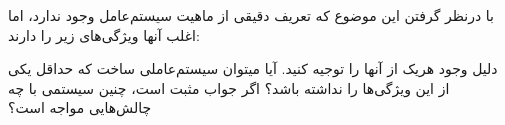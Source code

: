 \question[15] با درنظر گرفتن این موضوع که تعریف دقیقی از ماهیت سیستم‌عامل وجود ندارد، اما اغلب آنها ویژگی‌های زیر را دارند:
دلیل وجود هریک از آنها را توجیه کنید.
آیا میتوان سیستم‌عاملی ساخت که حداقل یکی از این ویژگی‌ها را نداشته باشد؟ اگر جواب مثبت است، چنین سیستمی با چه چالش‌هایی مواجه است؟
